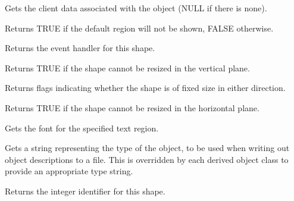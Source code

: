 

Gets the client data associated with the object (NULL if there is
none).



Returns TRUE if the default region will not be shown, FALSE otherwise.



Returns the event handler for this shape.



Returns TRUE if the shape cannot be resized in the vertical plane.



Returns flags indicating whether the shape is of fixed size in either direction.



Returns TRUE if the shape cannot be resized in the horizontal plane.



Gets the font for the specified text region.



Gets a string representing the type of the object, to be used when
writing out object descriptions to a file. This is overridden by
each derived object class to provide an appropriate type string.



Returns the integer identifier for this shape.



